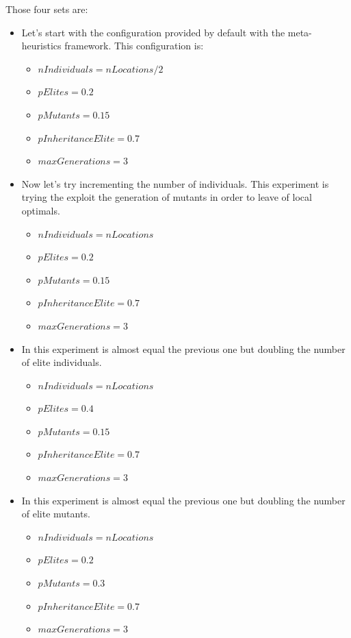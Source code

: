 \documentclass[]{report}
\begin{document}
Those four sets are:
\begin{itemize}
	\item Let's start with the configuration provided by default with the meta-heuristics framework. This configuration is: 
	\begin{itemize}
		\item $nIndividuals=nLocations/2$
		\item $pElites=0.2$
		\item $pMutants=0.15$
		\item $pInheritanceElite=0.7$
		\item $maxGenerations=3$
	\end{itemize}
	\item Now let's try incrementing the number of individuals. This experiment is trying the exploit the generation of mutants in order to leave of local optimals.
	\begin{itemize}
		\item $nIndividuals=nLocations$
		\item $pElites=0.2$
		\item $pMutants=0.15$
		\item $pInheritanceElite=0.7$
		\item $maxGenerations=3$
	\end{itemize}
	
	\item In this experiment is almost equal the previous one but doubling the number of elite individuals. 
	\begin{itemize}
		\item $nIndividuals=nLocations$
		\item $pElites=0.4$
		\item $pMutants=0.15$
		\item $pInheritanceElite=0.7$
		\item $maxGenerations=3$
	\end{itemize}

	\item  In this experiment is almost equal the previous one but doubling the number of elite mutants. 
	\begin{itemize}
		\item $nIndividuals=nLocations$
		\item $pElites=0.2$
		\item $pMutants=0.3$
		\item $pInheritanceElite=0.7$
		\item $maxGenerations=3$
	\end{itemize}
\end{itemize}
\end{document}
